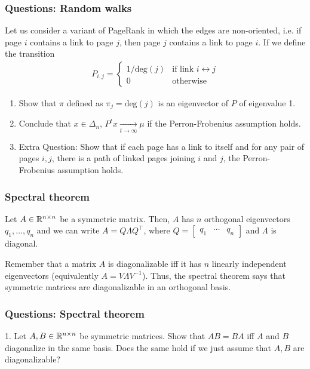 \documentclass{beamer}
\begin{document}
\begin{frame}[t]
\frametitle{Questions: Random walks}
Let us consider a variant of PageRank in which the edges are non-oriented, i.e. if page $i$ contains a link to page $j$, then page $j$ contains a link to page $i$. If we define the transition 
\begin{align*}
P_{i,j} =
\begin{cases}
1/\text{deg}(j) &\text{if link } i \leftrightarrow j  \\
0 &\text{otherwise}
\end{cases}
\end{align*}
\begin{enumerate}
\item Show that $\pi$ defined as $\pi_j = \text{deg}(j)$ is an eigenvector of $P$ of eigenvalue 1.
\item Conclude that $x \in \Delta_n$,  $P^t x \xrightarrow[t \to \infty]{} \mu$ if the Perron-Frobenius assumption holds.
\item Extra Question: Show that if each page has a link to itself and for any pair of pages $i,j$, there is a path of linked pages joining $i$ and $j$, the Perron-Frobenius assumption holds.
\end{enumerate}
\end{frame}

\begin{frame}[t]
\frametitle{Spectral theorem}
\begin{theorem}
Let $A \in \mathbb{R}^{n \times n}$ be a symmetric matrix. Then, $A$ has $n$ orthogonal eigenvectors $q_1, \dots, q_n$ and we can write $A = Q \Lambda Q^\top$, where $Q = \begin{bmatrix} q_1 & \cdots & q_n \end{bmatrix}$ and $\Lambda$ is diagonal.
\end{theorem}

Remember that a matrix $A$ is diagonalizable iff it has $n$ linearly independent eigenvectors (equivalently $A = V \Lambda V^{-1}$). Thus, the spectral theorem says that symmetric matrices are diagonalizable in an orthogonal basis.
\end{frame}

\begin{frame}[t]
\frametitle{Questions: Spectral theorem}
1. Let $A, B \in \mathbb{R}^{n \times n}$ be symmetric matrices. Show that $AB = BA$ iff $A$ and $B$ diagonalize in the same basis. Does the same hold if we just assume that $A,B$ are diagonalizable?
\pause
\end{frame}
\end{document}
